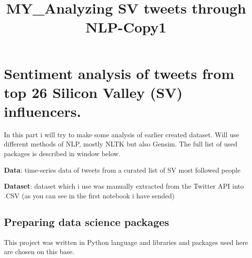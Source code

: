 \documentclass[11pt]{article}
\title{MY\_Analyzing SV tweets through NLP-Copy1}
\begin{document}
    
    
    \maketitle
    
    

    
    \section{Sentiment analysis of tweets from top 26 Silicon Valley (SV)
influencers.}\label{sentiment-analysis-of-tweets-from-top-26-silicon-valley-sv-influencers.}

    In this part i will try to make some analysis of earlier created
dataset. Will use different methods of NLP, mostly NLTK but also Gensim.
The full list of used packages is described in window below.

\textbf{Data}: time-series data of tweets from a curated list of SV most
followed people

\textbf{Dataset}: dataset which i use was manually extracted from the
Twitter API into .CSV (as you can see in the first notebook i have
sended)

    \subsection{Preparing data science
packages}\label{preparing-data-science-packages}

This project was written in Python language and libraries and packages
used here are chosen on this base.
\end{document}
